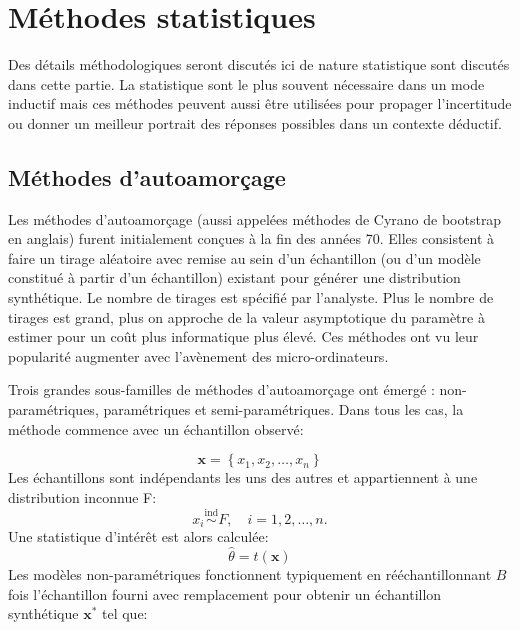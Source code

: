 \section{Méthodes statistiques}
    Des détails méthodologiques seront discutés ici de nature statistique sont discutés dans cette partie. La statistique sont le plus souvent nécessaire dans un mode inductif mais ces méthodes peuvent aussi être utilisées pour propager l'incertitude ou donner un meilleur portrait des réponses possibles dans un contexte déductif. 
    \subsection{Méthodes d'autoamorçage}\label{ssec:autoamorçage}
        Les méthodes d'autoamorçage (aussi appelées méthodes de Cyrano  de bootstrap en anglais) furent initialement conçues à la fin des années 70\parencite{efron_bootstrap_1979,miller_jackknife_1974}. Elles consistent à faire un tirage aléatoire avec remise au sein d'un échantillon (ou d'un modèle constitué à partir d'un échantillon) existant pour générer une distribution synthétique. Le nombre de tirages est spécifié par l'analyste. Plus le nombre de tirages est grand, plus on approche de la valeur asymptotique du paramètre à estimer pour un coût plus informatique plus élevé. Ces méthodes ont vu leur popularité augmenter avec l'avènement des micro-ordinateurs.\par
        Trois grandes sous-familles de méthodes d'autoamorçage ont émergé \parencite{davison_bootstrap_1999}: non-paramétriques, paramétriques et semi-paramétriques. Dans tous les cas, la méthode commence avec un échantillon observé:\par
        \begin{equation}
            \mathbf{x} = \left\{ x_1,x_2,\ldots,x_n\right\}
        \end{equation}
        Les échantillons sont indépendants les uns des autres et appartiennent à une distribution inconnue F:
        \begin{equation}
            x_i \stackrel{\text{ind}}{\sim} F, \quad i = 1, 2, \dots, n.
        \end{equation}
        Une statistique d'intérêt est alors calculée: 
        \begin{equation}
            \hat\theta = t(\mathbf{x})
        \end{equation}
        Les modèles non-paramétriques fonctionnent typiquement en rééchantillonnant $B$ fois l'échantillon fourni avec remplacement pour obtenir un échantillon synthétique $\mathbf{x}^*$ tel que:
